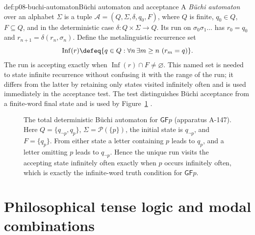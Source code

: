 \begin{hbdefinition}{def:p08-buchi-automaton}{B\"uchi automaton and acceptance}
A \emph{B\"uchi automaton} over an alphabet \(\Sigma\) is a tuple
\(\mathcal A=(Q,\Sigma,\delta,q_0,F)\), where \(Q\) is finite,
\(q_0\in Q\), \(F\subseteq Q\), and in the deterministic case
\(\delta:Q\times\Sigma\to Q\).  Its run on
\(\sigma_0\sigma_1\ldots\) has \(r_0=q_0\) and
\(r_{n+1}=\delta(r_n,\sigma_n)\).  Define the metalinguistic recurrence set
\[
 \operatorname{Inf}(r)\defeq
 \{q\in Q:\forall n\,\exists m\ge n\ (r_m=q)\}.
\]
The run is accepting exactly when
\(\operatorname{Inf}(r)\cap F\ne\varnothing\).  This named set is needed to
state infinite recurrence without confusing it with the range of the run; it
differs from the latter by retaining only states visited infinitely often and
is used immediately in the acceptance test.  The test distinguishes B\"uchi
acceptance from a finite-word final state and is used by
Figure~\ref{fig:p08-buchi-gfp}
\cite{Buchi1962,VardiWolper1986}.
\end{hbdefinition}

\begin{figure}[!htbp]
\centering
{}
\caption{The total deterministic B\"uchi automaton for
\(\mathsf G\mathsf Fp\) (apparatus A-147).  Here
\(Q=\{q_{\neg p},q_p\}\), \(\Sigma=\mathcal P(\{p\})\), the initial state is
\(q_{\neg p}\), and \(F=\{q_p\}\).  From either state a letter containing
\(p\) leads to \(q_p\), and a letter omitting \(p\) leads to
\(q_{\neg p}\).  Hence the unique run visits the accepting state infinitely
often exactly when \(p\) occurs infinitely often, which is exactly the
infinite-word truth condition for \(\mathsf G\mathsf Fp\).}
\label{fig:p08-buchi-gfp}
\end{figure}

\section[Philosophical tense logic]{Philosophical tense logic and modal combinations}

